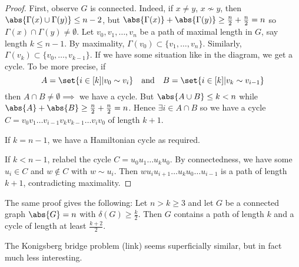 \documentclass{article}
\begin{document}
\begin{proof}
    First, observe $G$ is connected. Indeed, if $x \neq y$, $x \nsim y$, then $\abs{\Gamma(x) \cup \Gamma(y)} \leq n-2$, but $\abs{\Gamma(x)} + \abs{\Gamma(y)} \geq \frac{n}{2} + \frac{n}{2} = n$ so $\Gamma(x) \cap \Gamma(y) \neq \emptyset$.
    Let $v_0, v_1, \dotsc, v_n$ be a path of maximal length in $G$, say length $k \leq n-1$.
    By maximality, $\Gamma(v_0) \subset \{v_1, \dotsc, v_n\}$. Similarly, $\Gamma(v_k) \subset \{v_0, \dotsc, v_{k-1}\}$.
    If we have some situation like in the %
    diagram, we get a cycle. To be more precise, if
    \begin{equation*}
        A = \set{i \in [k] | v_0 \sim v_i} \quad \text{and} \quad B = \set{i \in [k] | v_k \sim v_{i-1}}
    \end{equation*}
    then $A \cap B \neq \emptyset \implies$ we have a cycle. But $\abs{A \cup B} \leq k < n$ while $\abs{A} + \abs{B} \geq \frac{n}{2} + \frac{n}{2} = n$.
    Hence $\exists i \in A \cap B$ so we have a cycle $C = v_0 v_1 \dotsc v_{i-1} v_k v_{k-1} \dotsc v_i v_0$ of length $k+1$.

    If $k = n-1$, we have a Hamiltonian cycle as required.

    If $k < n-1$, relabel the cycle $C = u_0 u_1 \dotsc u_k u_0$.
    By connectedness, we have some $u_i \in C$ and $w \notin C$ with $w \sim u_i$.
    Then $w u_i u_{i+1} \dotsc u_k u_0 \dotsc u_{i-1}$ is a path of length $k+1$, contradicting maximality.
\end{proof}

\begin{remark}
    The same proof gives the following:
    Let $n > k \geq 3$ and let $G$ be a connected graph $\abs{G} = n$ with $\delta(G) \geq \frac{k}{2}$. Then $G$ contains a path of length $k$ and a cycle of length at least $\frac{k+2}{2}$.
\end{remark}

The Konigsberg bridge problem (link) seems superficially similar, but in fact much less interesting.
\end{document}
